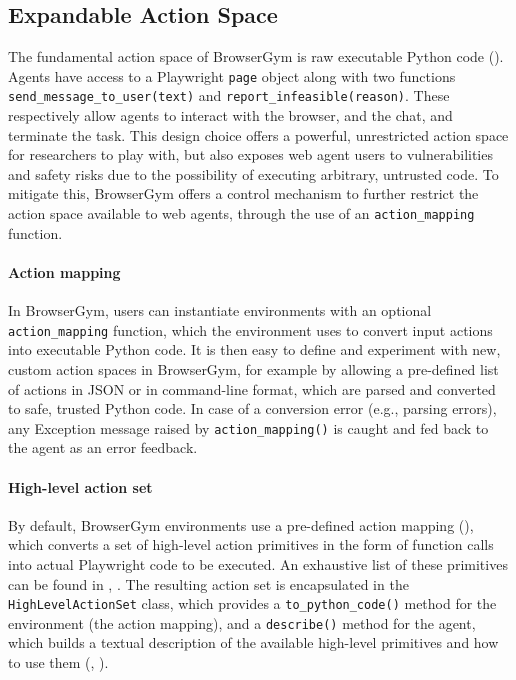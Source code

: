\documentclass[10pt]{article} %
\begin{document}
\subsection{Expandable Action Space}

The fundamental action space of BrowserGym is raw executable Python code (). Agents have access to a Playwright \texttt{page} object along with two functions \texttt{send\_message\_to\_user(text)} and \texttt{report\_infeasible(reason)}. These respectively allow agents to interact with the browser, and the chat, and terminate the task. This design choice offers a powerful, unrestricted action space for researchers to play with, but also exposes web agent users to vulnerabilities and safety risks due to the possibility of executing arbitrary, untrusted code. To mitigate this, BrowserGym offers a control mechanism to further restrict the action space available to web agents, through the use of an \texttt{action\_mapping} function.

\paragraph{Action mapping} In BrowserGym, users can instantiate environments with an optional \texttt{action\_mapping} function, which the environment uses to convert input actions into executable Python code. It is then easy to define and experiment with new, custom action spaces in BrowserGym, for example by allowing a pre-defined list of actions in JSON or in command-line format, which are parsed and converted to safe, trusted Python code. In case of a conversion error (e.g., parsing errors), any Exception message raised by \texttt{action\_mapping()} is caught and fed back to the agent as an error feedback.

\paragraph{High-level action set} By default, BrowserGym environments use a pre-defined action mapping (), which converts a set of high-level action primitives in the form of function calls into actual Playwright code to be executed. An exhaustive list of these primitives can be found in , . The resulting action set is encapsulated in the \texttt{HighLevelActionSet} class, which provides a \texttt{to\_python\_code()} method for the environment (the action mapping), and a \texttt{describe()} method for the agent, which builds a textual description of the available high-level primitives and how to use them (, ).
\end{document}
